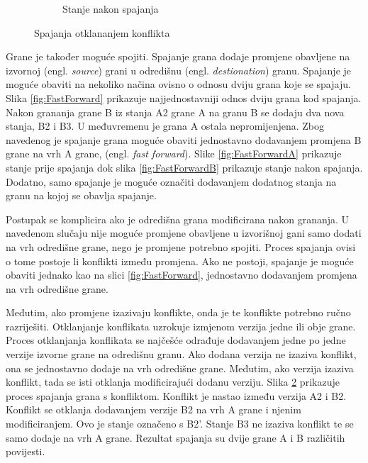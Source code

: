 \documentclass[times, utf8, diplomski, numeric]{fer}
\newcommand{\eng}[1]{(engl. \textit{#1})}
\begin{document}
\begin{figure}[b!]
\begin{subfigure}{.49\textwidth}
        \caption{Stanje nakon spajanja}
        \label{fig:ConflictB}
    \end{subfigure}
    \caption{Spajanja otklananjem konflikta}
    \label{fig:Conflict}
\end{figure}

Grane je također moguće spojiti. Spajanje grana dodaje promjene obavljene na izvornoj \eng{source} grani u odredišnu \eng{destionation} granu. Spajanje je moguće obaviti na nekoliko načina ovisno o odnosu dviju grana koje se spajaju. Slika \ref{fig:FastForward} prikazuje najjednostavniji odnos dviju grana kod spajanja. Nakon grananja grane B iz stanja A2 grane A na granu B se dodaju dva nova stanja, B2 i B3. U međuvremenu je grana A ostala nepromijenjena. Zbog navedenog je spajanje grana moguće obaviti jednostavno dodavanjem promjena B grane na vrh A grane, \eng{fast forward}. Slike \ref{fig:FastForwardA} prikazuje stanje prije spajanja dok slika \ref{fig:FastForwardB} prikazuje stanje nakon spajanja. Dodatno, samo spajanje je moguće označiti dodavanjem dodatnog stanja na granu na kojoj se obavlja spajanje.

Postupak se komplicira ako je odredišna grana modificirana nakon grananja. U navedenom slučaju nije moguće promjene obavljene u izvorišnoj gani samo dodati na vrh odredišne grane, nego je promjene potrebno spojiti. Proces spajanja ovisi o tome postoje li konflikti između promjena. Ako ne postoji, spajanje je moguće obaviti jednako kao na slici \ref{fig:FastForward}, jednostavno dodavanjem promjena na vrh odredišne grane.

Međutim, ako promjene izazivaju konflikte, onda je te konflikte potrebno ručno razriješiti. Otklanjanje konflikata uzrokuje izmjenom verzija jedne ili obje grane. Proces otklanjanja konflikata se najčešće odrađuje dodavanjem jedne po jedne verzije izvorne grane na odredišnu granu. Ako dodana verzija ne izaziva konflikt, ona se jednostavno dodaje na vrh odredišne grane. Međutim, ako verzija izaziva konflikt, tada se isti otklanja modificirajući dodanu verziju. Slika \ref{fig:Conflict} prikazuje proces spajanja grana s konfliktom. Konflikt je nastao između verzija A2 i B2. Konflikt se otklanja dodavanjem verzije B2 na vrh A grane i njenim modificiranjem. Ovo je stanje označeno s B2'. Stanje B3 ne izaziva konflikt te se samo dodaje na vrh A grane. Rezultat spajanja su dvije grane A i B različitih povijesti.
\end{document}
